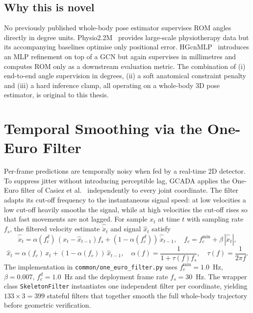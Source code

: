 \subsection{Why this is novel}
No previously published whole-body pose estimator supervises ROM
angles directly in degree units. Physio2.2M~\cite{Rode2025SciReports}
provides large-scale physiotherapy data but its accompanying baselines
optimise only positional error. HGcnMLP~\cite{Hu2024_FrontBioengBiotechnol_HGcnMLP}
introduces an MLP refinement on top of a GCN but again supervises in
millimetres and computes ROM only as a downstream evaluation metric.
The combination of (i) end-to-end angle supervision in degrees,
(ii) a soft anatomical constraint penalty and (iii) a hard inference
clamp, all operating on a whole-body 3D pose estimator, is original
to this thesis.

\section{Temporal Smoothing via the One-Euro Filter}
\label{sec:one-euro}

Per-frame predictions are temporally noisy when fed by a real-time 2D
detector. To suppress jitter without introducing perceptible lag,
GCADA applies the One-Euro filter of Casiez et al.~\cite{casiez2012euro}
independently to every joint coordinate. The filter adapts its cut-off
frequency to the instantaneous signal speed: at low velocities a low
cut-off heavily smooths the signal, while at high velocities the
cut-off rises so that fast movements are not lagged. For sample $x_{t}$
at time $t$ with sampling rate $f_{s}$, the filtered velocity estimate
$\hat{\dot{x}}_{t}$ and signal $\hat{x}_{t}$ satisfy
\begin{equation}
\hat{\dot{x}}_{t} = \alpha(f_{c}^{d})\,(x_{t}-\hat{x}_{t-1})f_{s}
+(1-\alpha(f_{c}^{d}))\,\hat{\dot{x}}_{t-1},
\quad
f_{c} = f_{c}^{\min} + \beta\,|\hat{\dot{x}}_{t}|,
\label{eq:euro-vel}
\end{equation}
\begin{equation}
\hat{x}_{t} = \alpha(f_{c})\,x_{t} + (1-\alpha(f_{c}))\,\hat{x}_{t-1},
\quad
\alpha(f) = \frac{1}{1+\tau(f) f_{s}},
\quad
\tau(f) = \frac{1}{2\pi f}.
\label{eq:euro-pos}
\end{equation}
The implementation in \texttt{common/one\_euro\_filter.py} uses
$f_{c}^{\min}\!=\!1.0$~Hz, $\beta\!=\!0.007$, $f_{c}^{d}\!=\!1.0$~Hz
and the deployment frame rate $f_{s}\!=\!30$~Hz. The wrapper class
\texttt{SkeletonFilter} instantiates one independent filter per
coordinate, yielding $133\!\times\!3=399$ stateful filters that
together smooth the full whole-body trajectory before geometric
verification.


